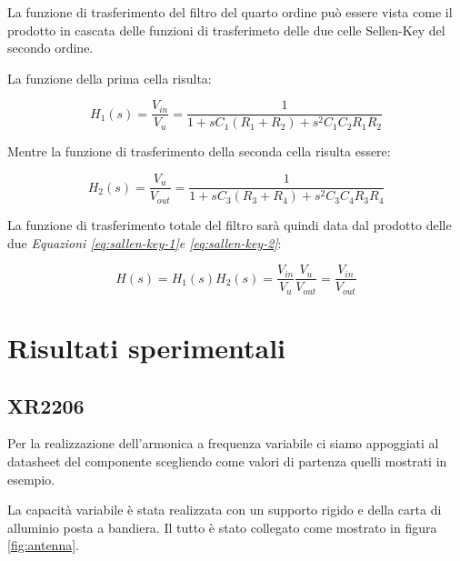\documentclass[titlepage]{report}
\begin{document}
	La funzione di trasferimento del filtro del quarto ordine può essere vista come il prodotto in cascata delle funzioni di trasferimeto delle due celle Sellen-Key del secondo ordine.

	La funzione della prima cella risulta:

	\begin{equation}
		\label{eq:sallen-key-1}
		H_1(s) = \frac{V_{in}}{V_u}  =  \frac{1}{1 + sC_1(R_1 + R_2)+ s^2C_1C_2R_1R_2 } 
	\end{equation}

	Mentre la funzione di trasferimento della seconda cella risulta essere:

	\begin{equation}
		\label{eq:sallen-key-2}
		H_2(s) = \frac{V_u}{V_{out}}  = \frac{1}{1 + sC_3(R_3 + R_4)+ s^2C_3C_4R_3R_4 } 
	\end{equation}

	La funzione di trasferimento totale del filtro sarà quindi data dal prodotto delle due \textit{Equazioni \ref{eq:sallen-key-1}e \ref{eq:sallen-key-2}}:

	\begin{equation}
		H(s) = H_1(s)H_2(s) =  \frac{V_{in}}{V_u}\frac{V_u}{V_{out}} = \frac{V_{in}}{V_{out}}
	\end{equation}

	
\chapter{Risultati sperimentali}

\section{XR2206}
	Per la realizzazione dell'armonica a frequenza variabile ci siamo appoggiati al datasheet del componente scegliendo come valori di partenza quelli mostrati in esempio. 
	
	La capacità variabile è stata realizzata con un supporto rigido e della carta di alluminio posta a bandiera. Il tutto è stato collegato come mostrato in figura \ref{fig:antenna}.
\end{document}
